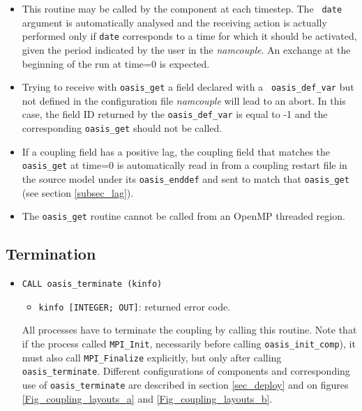 \begin{itemize}

\item This routine may be called by the component at each timestep. The {\tt
  date} argument is automatically analysed and the receiving action is
actually performed only if {\tt date} corresponds to a time for which
it should be activated, given the period indicated by the user in the
{\it namcouple}. An exchange at the beginning of the run at time=0 is
expected.

\item Trying to receive with {\tt oasis\_get} a field declared with a {\tt
  oasis\_def\_var} but not defined in the configuration file {\it
  namcouple} will lead to an abort. In this case, the field ID
returned by the {\tt oasis\_def\_var} is equal to -1 and the
corresponding {\tt oasis\_get} should not be called.

\item If a coupling field has a positive lag, the coupling field that
  matches the {\tt oasis\_get} at time=0 is automatically read in from a coupling
  restart file in the source model under its {\tt oasis\_enddef} and sent to match that {\tt oasis\_get}
    (see section \ref{subsec_lag}).

\item The {\tt oasis\_get} routine cannot be called from an OpenMP
threaded region.

\end{itemize}


\subsection{Termination}
\label{subsubsec_Termination}

\begin{itemize}

\item {\tt CALL oasis\_terminate (kinfo)}
  \begin{itemize}
  \item {\tt kinfo [INTEGER; OUT]}: returned error code.
  \end{itemize}
All processes have to terminate the coupling by calling this routine. Note that if the process called {\tt MPI\_Init}, necessarily before calling {\tt oasis\_init\_comp}), it must also call {\tt MPI\_Finalize} explicitly, but only after calling {\tt oasis\_terminate}. Different configurations of components and corresponding use of {\tt oasis\_terminate} are described in section \ref{sec_deploy} and on figures \ref{Fig_coupling_layouts_a} and \ref{Fig_coupling_layouts_b}.

\end{itemize}

